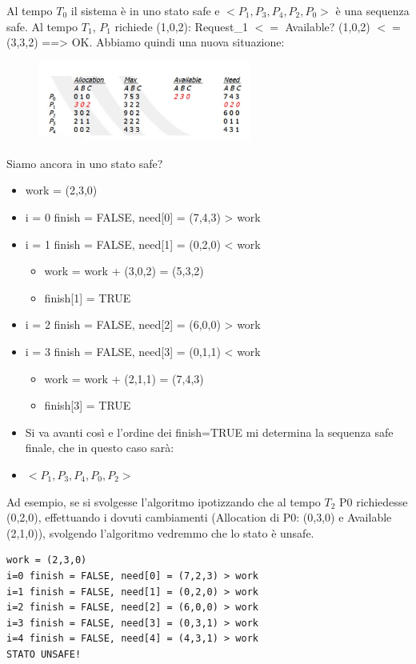 \documentclass[a4paper]{article}
\begin{document}
Al tempo $T_0$ il sistema è in uno stato safe e $<P_1, P_3, P_4, P_2, P_0>$ è una sequenza safe. \newline
Al tempo $T_1$, $P_1$ richiede (1,0,2): Request\_1 $<=$ Available? (1,0,2) $<=$ (3,3,2) ==> OK. Abbiamo quindi una nuova situazione:
\begin{figure}[h!]
    \includegraphics[width=7cm]{img/bank1.JPG}
\end{figure}

Siamo ancora in uno stato safe?
\begin{itemize}
    \item work = (2,3,0)
    \item i = 0 finish = FALSE, need[0] = (7,4,3) > work
    \item i = 1 finish = FALSE, need[1] = (0,2,0) < work
          \begin{itemize}
              \item work = work + (3,0,2) = (5,3,2)
              \item finish[1] = TRUE
          \end{itemize}
    \item i = 2 finish = FALSE, need[2] = (6,0,0) > work
    \item i = 3 finish = FALSE, need[3] = (0,1,1) < work
          \begin{itemize}
              \item work = work + (2,1,1) = (7,4,3)
              \item finish[3] = TRUE
          \end{itemize}
    \item Si va avanti così e l'ordine dei finish=TRUE mi determina la sequenza safe finale, che in questo caso sarà:
    \item $<P_1, P_3, P_4, P_0, P_2>$
\end{itemize}

Ad esempio, se si svolgesse l'algoritmo ipotizzando che al tempo $T_2$ P0 richiedesse (0,2,0), effettuando i dovuti cambiamenti (Allocation di P0: (0,3,0) e Available (2,1,0)), svolgendo l'algoritmo vedremmo che lo stato è unsafe.
\begin{Verbatim}
work = (2,3,0)
i=0 finish = FALSE, need[0] = (7,2,3) > work
i=1 finish = FALSE, need[1] = (0,2,0) > work
i=2 finish = FALSE, need[2] = (6,0,0) > work
i=3 finish = FALSE, need[3] = (0,3,1) > work
i=4 finish = FALSE, need[4] = (4,3,1) > work
STATO UNSAFE!
\end{Verbatim}
\end{document}
